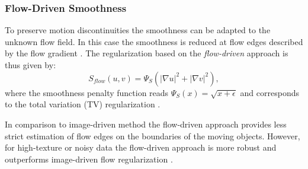 \subsubsection{Flow-Driven Smoothness}
\label{flow_driven}

To preserve motion discontinuities the smoothness can be adapted to the unknown flow field. In this case the smoothness is reduced at flow edges described by the flow gradient \cite{Shulman89, Schnorr94}.
The regularization based on the \textit{flow-driven} approach is thus given by:
$$ S_{flow}(u,v) = \Psi_{S}(|\nabla u|^2 + |\nabla v|^2), $$
where the smoothness penalty function reads  $\Psi_{S}(x) = \sqrt{x + \epsilon}$ and corresponds to the total variation (TV) regularization \cite{ROF92}.

In comparison to image-driven method the flow-driven approach provides less strict estimation of flow edges on the boundaries of the moving objects. However, for high-texture or noisy data the flow-driven approach is more robust and outperforms image-driven flow regularization \cite{Brox04, Papenberg06, Wedel09}.   



%
%
%
%
%



